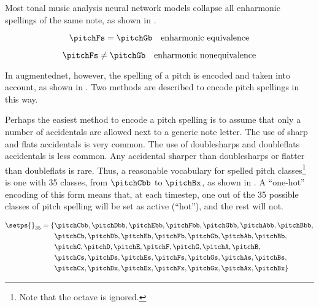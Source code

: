 
Most tonal music analysis neural network models collapse all
enharmonic spellings of the same note, as shown in
.

\begin{equation}
    \label{eq:enharmonic_equivalence}
    \pitchFs = \pitchGb \quad \text{enharmonic equivalence}
\end{equation}

\begin{equation}
    \label{eq:enharmonic_nonequivalence}
    \pitchFs \neq \pitchGb \quad \text{enharmonic nonequivalence}
\end{equation}

In \gls{augmentednet}, however, the spelling of a pitch is
encoded and taken into account, as shown in
. Two methods are described
to encode pitch spellings in this way.



Perhaps the easiest method to encode a pitch spelling is to
assume that only a number of accidentals are allowed next to
a generic note letter. The use of \gls{sharp} and
\glspl{flat} accidentals is very common. The use of
\glspl{doublesharp} and \glspl{doubleflat} accidentals is
less common. Any accidental sharper than \glspl{doublesharp}
or flatter than \glspl{doubleflat} is rare. Thus, a
reasonable vocabulary for spelled pitch
classes\footnote{Note that the octave is ignored.} is one
with 35 classes, from $\pitchCbb$ to $\pitchBx$, as shown in
. A ``one-hot'' encoding of this
form means that, at each timestep, one out of the 35
possible classes of pitch spelling will be set as active
(``hot''), and the rest will not.

\begin{equation}
    \label{eq:pitch_spelling_35}
    \begin{split}
    \setps{}_{35} = \{ & \pitchCbb, \pitchDbb, \pitchEbb, \pitchFbb, \pitchGbb, \pitchAbb, \pitchBbb, \\
    & \pitchCb, \pitchDb, \pitchEb, \pitchFb, \pitchGb, \pitchAb, \pitchBb, \\
    & \pitchC, \pitchD, \pitchE, \pitchF, \pitchG, \pitchA, \pitchB, \\
    & \pitchCs, \pitchDs, \pitchEs, \pitchFs, \pitchGs, \pitchAs, \pitchBs, \\
    & \pitchCx, \pitchDx, \pitchEx, \pitchFx, \pitchGx, \pitchAx, \pitchBx \}
    \end{split}
\end{equation}

